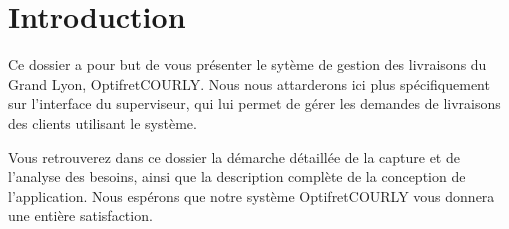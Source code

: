 \chapter*{Introduction}

Ce dossier a pour but de vous présenter le sytème de gestion des livraisons du Grand Lyon,
Opti\textunderscore fret\textunderscore COURLY. Nous nous attarderons ici plus spécifiquement sur l'interface du
superviseur, qui lui permet de gérer les demandes de livraisons des clients utilisant le système.

Vous retrouverez dans ce dossier la démarche détaillée de la capture et de l'analyse des besoins, ainsi que la
description complète de la conception de l'application. Nous espérons que notre système Optifret\textunderscore COURLY vous donnera
une entière satisfaction.

